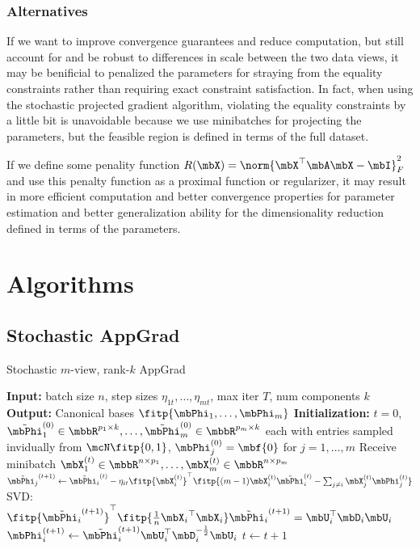 \documentclass{article}
\begin{document}
	\subsubsection{Alternatives} \label{subsubsec:alternatives}
	If we want to improve convergence guarantees and reduce computation, but still account for and be robust to differences in scale between the two data views, it may be benificial to penalized the parameters for straying from the equality constraints rather than requiring exact constraint satisfaction. In fact, when using the stochastic projected gradient algorithm, violating the equality constraints by a little bit is unavoidable because we use minibatches for projecting the parameters, but the feasible region is defined in terms of the full dataset.
	
	If we define some penality function $R(\mbX) = \norm{\mbX^{\top}\mbA\mbX - \mbI}_F^2$ and use this penalty function as a proximal function or regularizer, it may result in more efficient computation and better convergence properties for parameter estimation and better generalization ability for the dimensionality reduction defined in terms of the parameters.
	
\section{Algorithms} \label{sec:alg}

	\subsection{Stochastic AppGrad} \label{subsec:appgrad}
	
	\begin{algorithm}
	\caption{Stochastic $m$-view, rank-$k$ AppGrad} \label{alg:stochappgrad}
	\begin{algorithmic}[1]
		\STATE \textbf{Input:} batch size $n$, step sizes $\eta_{1t},\ldots,\eta_{mt}$, max iter $T$, num components $k$
		\STATE \textbf{Output:} Canonical bases $\fitp{\mbPhi_1, \ldots, \mbPhi_m}$
		\STATE \textbf{Initialization:} $t=0$, $\tilde{\mbPhi}_1^{(0)} \in \mbbR^{p_1 \times k}, \ldots, \tilde{\mbPhi}_m^{(0)} \in \mbbR^{p_m \times k}$ each with entries sampled invidually from $\mcN \fitp{0,1}$, $\mbPhi_j^{(0)} = \mbf{0}$ for $j = 1,\ldots,m$
		\STATE Receive minibatch $\mbX_1^{(t)} \in \mbbR^{n \times p_1}, \ldots, \mbX_m^{(t)} \in \mbbR^{n \times p_m}$
		\STATE $\tilde{\mbPhi_j}^{(t+1)} \leftarrow \tilde{\mbPhi_i}^{(t)} - \eta_{it}\fitp{\mbX_i^{(t)}}^{\top}\fitp{(m-1)\mbX_i^{(t)}\tilde{\mbPhi}_i^{(t)} - \sum_{j \neq i}\mbX_j^{(t)}\mbPhi_j^{(t)}}$
		\STATE SVD: $\fitp{\tilde{\mbPhi_i}^{(t+1)}}^{\top} \fitp{\frac{1}{n} {\mbX_i}^{\top}\mbX_i}\tilde{\mbPhi_i}^{(t+1)} = \mbU_i^{\top}\mbD_i\mbU_i$
		\STATE $\mbPhi_i^{(t+1)} \leftarrow \tilde{\mbPhi}_i^{(t+1)}\mbU_i^{\top}\mbD_i^{-\frac{1}{2}}\mbU_i$
		\ENDFOR
		\STATE $t \leftarrow t+1$
		\ENDWHILE
	\end{algorithmic}
	\end{algorithm}
	
\end{document}

